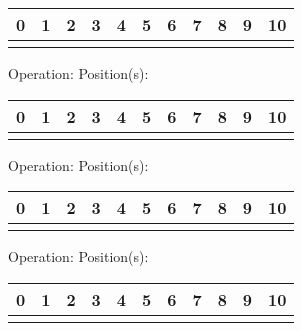 {{\begin{center}
\begin{tabular}{|P{0.75cm}|P{0.75cm}|P{0.75cm}|P{0.75cm}|P{0.75cm}|P{0.75cm}|P{0.75cm}|P{0.75cm}|P{0.75cm}|P{0.75cm}|P{0.75cm}|}
                 & 1 & 2 & 3 & 4 & 5 & 6 & 7 & 8 & 9 & 10  \\
                \hline
                &&&&&&&&&& \\
                \hline
            \end{tabular}
        \end{center}
        Operation: \underline{\hspace{3cm}} \hspace{10px} Position(s): \underline{\hspace{2cm}}
        \begin{center}
            \begin{tabular}{|P{0.75cm}|P{0.75cm}|P{0.75cm}|P{0.75cm}|P{0.75cm}|P{0.75cm}|P{0.75cm}|P{0.75cm}|P{0.75cm}|P{0.75cm}|P{0.75cm}|}
                 & 1 & 2 & 3 & 4 & 5 & 6 & 7 & 8 & 9 & 10  \\
                \hline
                &&&&&&&&&& \\
                \hline
            \end{tabular}
        \end{center}
        Operation: \underline{\hspace{3cm}} \hspace{10px} Position(s): \underline{\hspace{2cm}}
        \begin{center}
            \begin{tabular}{|P{0.75cm}|P{0.75cm}|P{0.75cm}|P{0.75cm}|P{0.75cm}|P{0.75cm}|P{0.75cm}|P{0.75cm}|P{0.75cm}|P{0.75cm}|P{0.75cm}|}
                 & 1 & 2 & 3 & 4 & 5 & 6 & 7 & 8 & 9 & 10  \\
                \hline
                &&&&&&&&&& \\
                \hline
            \end{tabular}
        \end{center}
        Operation: \underline{\hspace{3cm}} \hspace{10px} Position(s): \underline{\hspace{2cm}}
        \begin{center}
            \begin{tabular}{|P{0.75cm}|P{0.75cm}|P{0.75cm}|P{0.75cm}|P{0.75cm}|P{0.75cm}|P{0.75cm}|P{0.75cm}|P{0.75cm}|P{0.75cm}|P{0.75cm}|}
                 & 1 & 2 & 3 & 4 & 5 & 6 & 7 & 8 & 9 & 10  \\
                \hline
                &&&&&&&&&& \\
                \hline
            \end{tabular}
        \end{center}
    }
}
